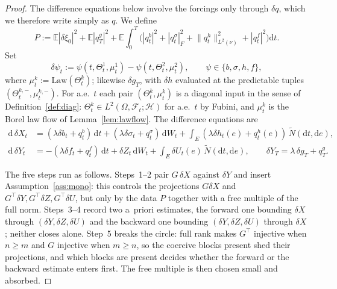\documentclass[preprint,12pt]{elsarticle}
\newcommand{\E}{\mathbb{E}}
\newcommand{\F}{\mathcal{F}}
\newcommand{\diff}{\mathrm{d}}
\newcommand{\Nt}{\widetilde{N}}
\newcommand{\Lnu}{L^2(\nu)}
\newcommand{\Gstar}{G^{\!\top}}
\newcommand{\Law}{\mathrm{Law}}
\newcommand{\Lnorm}[1]{\lVert #1\rVert_{\Lnu}}
\numberwithin{equation}{section}
\theoremstyle{plain}
\theoremstyle{definition}
\theoremstyle{\PaperRemarkStyle}
\begin{document}
\begin{proof}
The difference equations below involve the forcings only through $\delta q$, which we
therefore write simply as $q$. We define
\[
P:=\E|\delta\xi_0|^2+\E|q^g_T|^2
+\E\!\int_0^T\!\big(|q^b_t|^2+|q^\sigma_t|_F^2+\Lnorm{q^h_t}^2+|q^f_t|^2\big)\diff t .
\]
Set
\[
\delta\psi_t:=\psi(t,\Theta^1_t,\mu^1_t)-\psi(t,\Theta^2_t,\mu^2_t),\qquad
\psi\in\{b,\sigma,h,f\},
\]
where $\mu^k_t:=\Law(\Theta^k_t)$; likewise $\delta g_T$, with $\delta h$ evaluated at the
predictable tuples $(\Theta^{k,-}_t,\mu^{k,-}_t)$. For a.e.\ $t$ each pair
$(\Theta^k_t,\mu^k_t)$ is a diagonal input in the sense of Definition~\ref{def:diag}:
$\Theta^k_t\in L^2(\Omega,\F_t;\mathcal H)$ for a.e.\ $t$ by Fubini, and $\mu^k_t$ is
the Borel law flow of Lemma~\ref{lem:lawflow}.
The difference equations are
\begin{align}
\diff\,\delta X_t&=(\lambda\delta b_t+q^b_t)\,\diff t+(\lambda\delta\sigma_t+q^\sigma_t)\,\diff W_t
+\int_E(\lambda\delta h_t(e)+q^h_t(e))\,\Nt(\diff t,\diff e),\label{eq:dX}\\
\diff\,\delta Y_t&=-(\lambda\delta f_t+q^f_t)\,\diff t+\delta Z_t\,\diff W_t
+\int_E\delta U_t(e)\,\Nt(\diff t,\diff e),\qquad \delta Y_T=\lambda\,\delta g_T+q^g_T.\label{eq:dY}
\end{align}

The five steps run as follows. Steps~1--2 pair $G\,\delta X$ against $\delta Y$ and
insert Assumption~\ref{ass:mono}: this controls the projections $G\delta X$ and
$\Gstar\delta Y,\Gstar\delta Z,\Gstar\delta U$, but only by the data $P$ together with a
free multiple of the full norm. Steps~3--4 record two a~priori estimates, the forward one
bounding $\delta X$ through $(\delta Y,\delta Z,\delta U)$ and the backward one bounding
$(\delta Y,\delta Z,\delta U)$ through $\delta X$; neither closes alone.
Step~5 breaks the circle: full rank makes $\Gstar$ injective
when $n\ge m$ and $G$ injective when $m\ge n$, so the coercive blocks present shed their
projections, and which blocks are present decides whether the forward or the backward
estimate enters first. The free multiple is then chosen small and absorbed.


\end{proof}
\end{document}
